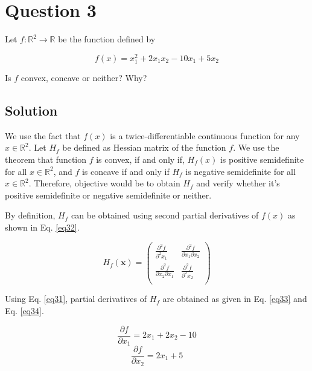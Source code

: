 \section*{Question 3}

Let $f: \mathbb{R}^2 \rightarrow \mathbb{R}$ be the function defined by

\begin{equation}
f(x) = x_1^2 + 2x_1 x_2 - 10x_1 + 5x_2
\label{eq31}
\end{equation}

Is $f$ convex, concave or neither? Why?

\subsection*{Solution}

We use the fact that $f(x)$ is a twice-differentiable continuous function for any $x\in \mathbb{R}^2$. Let $H_f$ be defined as Hessian matrix of the function $f$. We use the theorem that function $f$ is convex, if and only if, $H_f(x)$ is positive semidefinite for all $x\in \mathbb{R}^2$, and $f$ is concave if and only if $H_f$ is negative semidefinite for all $x\in \mathbb{R}^2$. Therefore, objective would be to obtain $H_f$ and verify whether it's positive semidefinite or negative semidefinite or neither.

By definition, $H_f$ can be obtained using second partial derivatives of $f(x)$ as shown in Eq. \ref{eq32}.

\begin{equation}
H_f(\mathbf{x})
= \begin{pmatrix}
\frac{\partial^2 f}{\partial^2 x_1} & \frac{\partial^2 f}{\partial x_1 \partial x_2}\\[0.6em]
\frac{\partial^2 f}{\partial x_2 \partial x_1} & \frac{\partial^2 f}{\partial^2 x_2}\\
\end{pmatrix}
\label{eq32}
\end{equation}

Using Eq. \ref{eq31}, partial derivatives of $H_f$ are obtained as given in Eq. \ref{eq33} and Eq. \ref{eq34}.

\begin{equation}
\frac{\partial f}{\partial x_1} = 2x_1 + 2x_2 - 10
\label{eq33}
\end{equation}
\begin{equation}
\frac{\partial f}{\partial x_2} = 2x_1 + 5
\label{eq34}
\end{equation}

